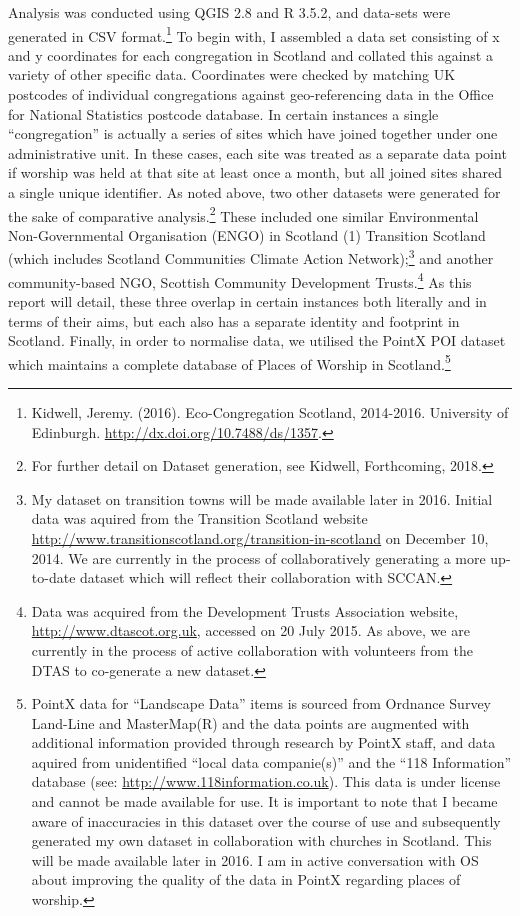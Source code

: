 \documentclass[11pt,]{article}
\let\rmarkdownfootnote\footnote%
\def\footnote{\protect\rmarkdownfootnote}
\begin{document}
Analysis was conducted using QGIS 2.8 and R 3.5.2, and data-sets were
generated in CSV format.\footnote{Kidwell, Jeremy. (2016).
  Eco-Congregation Scotland, 2014-2016. University of Edinburgh.
  \url{http://dx.doi.org/10.7488/ds/1357}.} To begin with, I assembled a
data set consisting of x and y coordinates for each congregation in
Scotland and collated this against a variety of other specific data.
Coordinates were checked by matching UK postcodes of individual
congregations against geo-referencing data in the Office for National
Statistics postcode database. In certain instances a single
``congregation'' is actually a series of sites which have joined
together under one administrative unit. In these cases, each site was
treated as a separate data point if worship was held at that site at
least once a month, but all joined sites shared a single unique
identifier. As noted above, two other datasets were generated for the
sake of comparative analysis.\footnote{For further detail on Dataset
  generation, see Kidwell, Forthcoming, 2018.} These included one
similar Environmental Non-Governmental Organisation (ENGO) in Scotland
(1) Transition Scotland (which includes Scotland Communities Climate
Action Network);\footnote{My dataset on transition towns will be made
  available later in 2016. Initial data was aquired from the Transition
  Scotland website
  \url{http://www.transitionscotland.org/transition-in-scotland} on
  December 10, 2014. We are currently in the process of collaboratively
  generating a more up-to-date dataset which will reflect their
  collaboration with SCCAN.} and another community-based NGO, Scottish
Community Development Trusts.\footnote{Data was acquired from the
  Development Trusts Association website,
  \url{http://www.dtascot.org.uk}, accessed on 20 July 2015. As above,
  we are currently in the process of active collaboration with
  volunteers from the DTAS to co-generate a new dataset.} As this report
will detail, these three overlap in certain instances both literally and
in terms of their aims, but each also has a separate identity and
footprint in Scotland. Finally, in order to normalise data, we utilised
the PointX POI dataset which maintains a complete database of Places of
Worship in Scotland.\footnote{PointX data for ``Landscape Data'' items
  is sourced from Ordnance Survey Land-Line and MasterMap(R) and the
  data points are augmented with additional information provided through
  research by PointX staff, and data aquired from unidentified ``local
  data companie(s)'' and the ``118 Information'' database (see:
  \url{http://www.118information.co.uk}). This data is under license and
  cannot be made available for use. It is important to note that I
  became aware of inaccuracies in this dataset over the course of use
  and subsequently generated my own dataset in collaboration with
  churches in Scotland. This will be made available later in 2016. I am
  in active conversation with OS about improving the quality of the data
  in PointX regarding places of worship.}
\end{document}
